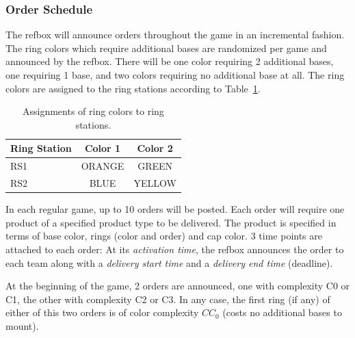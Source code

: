 \documentclass[12pt,twoside]{article}
\newcommand{\reftab}[1]{Table~\ref{#1}}
\begin{document}
\subsubsection{Order Schedule}
The \ac{refbox} will announce orders throughout the game in an
incremental fashion.
The ring colors which
require additional bases are randomized per game and announced by the
refbox. There will be one color requiring 2 additional bases, one
requiring 1 base, and two colors requiring no additional base at
all. The ring colors are assigned to the ring stations according to
\reftab{tab:main-track-ring-color-assignment}.

\begin{table}
\begin{tabular}{l||c|c}
  \bf{Ring Station} & \bf{Color 1} & \bf{Color 2} \\\hline
  RS1 & ORANGE & GREEN \\
  RS2 & BLUE & YELLOW
\end{tabular}
\caption{Assignments of ring colors to ring stations.}
\label{tab:main-track-ring-color-assignment}
\end{table}

In each regular game, up to 10 orders will be posted.
Each order will require one product of a specified product
type to be delivered.
The product is specified in terms of base
color, rings (color and order) and cap color.
3 time points are attached to each order:
At its \emph{activation time}, the \ac{refbox} announces the order to each
team along with a \emph{delivery start time} and a \emph{delivery end time}
(deadline).

At the beginning of the game, 2 orders are announced, one with complexity
C0 or C1, the other with complexity C2 or C3. In any case, the first ring
(if any) of either of this two orders is of color complexity $CC_0$
(costs no additional bases to mount).
\end{document}
